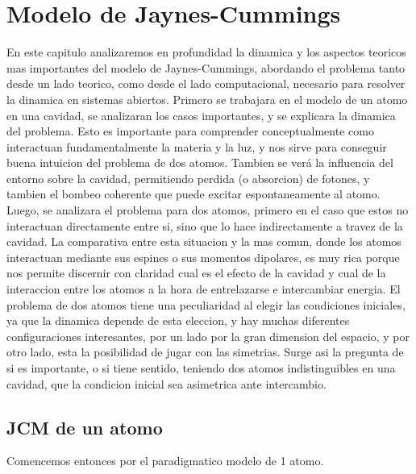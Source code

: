 \chapter{Modelo de Jaynes-Cummings}
\label{ch:jcm}

\pagestyle{fancy}
\fancyhf{}
\fancyhead[LE]{\nouppercase{\rightmark\hfill}}
\fancyhead[RO]{\nouppercase{\leftmark\hfill}}
\fancyfoot[LE,RO]{\hfill\thepage\hfill}

En este capitulo analizaremos en profundidad la dinamica y los aspectos teoricos mas importantes 
del modelo de Jaynes-Cummings, abordando el problema tanto desde un lado teorico, como desde
el lado computacional, necesario para resolver la dinamica en sistemas abiertos.
Primero se trabajara en el modelo de un atomo en una cavidad, se analizaran los casos importantes,
y se explicara la dinamica del problema. Esto es importante para comprender conceptualmente como
interactuan fundamentalmente la materia y la luz, y nos sirve para conseguir buena intuicion del
problema de dos atomos. Tambien se ver\'a la influencia del entorno sobre la cavidad, permitiendo
perdida (o absorcion) de fotones, y tambien el bombeo coherente que puede excitar espontaneamente
al atomo. \newline
Luego, se analizara el problema para dos atomos, primero en el caso que estos no interactuan
directamente entre si, sino que lo hace indirectamente a travez de la cavidad. La comparativa entre
esta situacion y la mas comun, donde los atomos interactuan mediante sus espines o sus momentos
dipolares, es muy rica porque nos permite discernir con claridad cual es el efecto de la cavidad
y cual de la interaccion entre los atomos a la hora de entrelazarse e intercambiar energia.
El problema de dos atomos tiene una peculiaridad al elegir las condiciones iniciales, ya que la
dinamica depende de esta eleccion, y hay muchas diferentes configuraciones interesantes, por un lado
por la gran dimension del espacio, y por otro lado, esta la posibilidad de jugar con las simetrias.
Surge asi la pregunta de si es importante, o si tiene sentido, teniendo dos atomos indistinguibles
en una cavidad, que la condicion inicial sea asimetrica ante intercambio. 

\section{JCM de un atomo}
Comencemos entonces por el paradigmatico modelo de 1 atomo. 